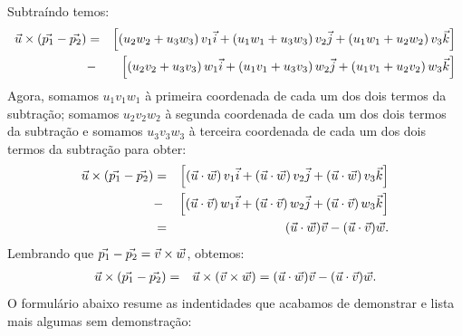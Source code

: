 Subtraíndo temos:
\begin{eqnarray*}
\vec{u}\times\left(\vec{p_1}-\vec{p_2}\right)&=&    \left[\left(u_2w_2+u_3w_3\right)v_1\vec{i}+\left(u_1w_1+u_3w_3\right)v_2\vec{j}+\left(u_1w_1+u_2w_2\right)v_3\vec{k}\right]\\
&-&
\left[\left(u_2v_2+u_3v_3\right)w_1\vec{i}+\left(u_1v_1+u_3v_3\right)w_2\vec{j}+\left(u_1v_1+u_2v_2\right)w_3\vec{k}\right]
\end{eqnarray*}
Agora, somamos $u_1v_1w_1$ à primeira coordenada de cada um dos dois termos da subtração; somamos $u_2v_2w_2$  à segunda coordenada de cada um dos dois termos da subtração e somamos $u_3v_3w_3$ à terceira coordenada de cada um dos dois termos da subtração para obter:
 \begin{eqnarray*}
 \vec{u}\times\left(\vec{p_1}-\vec{p_2}\right)&=&    \left[\left(\vec{u}\cdot\vec{w}\right)v_1\vec{i}+\left(\vec{u}\cdot\vec{w}\right)v_2\vec{j}+\left(\vec{u}\cdot\vec{w}\right)v_3\vec{k}\right]\\
 &-&
 \left[\left(\vec{u}\cdot\vec{v}\right)w_1\vec{i}+\left(\vec{u}\cdot\vec{v}\right)w_2\vec{j}+\left(\vec{u}\cdot\vec{v}\right)w_3\vec{k}\right]\\
 &=&(\vec{u}\cdot\vec{w})\vec{v}-(\vec{u}\cdot\vec{v})\vec{w}.
 \end{eqnarray*}
Lembrando que $\vec{p_1}-\vec{p_2}=\vec{v}\times\vec{w}$, obtemos:
\begin{eqnarray*}
\vec{u}\times\left(\vec{p_1}-\vec{p_2}\right)&=& 
\vec{u}\times\left(\vec{v}\times\vec{w}\right)=(\vec{u}\cdot\vec{w})\vec{v}-(\vec{u}\cdot\vec{v})\vec{w}.
\end{eqnarray*}
O formulário abaixo resume as indentidades que acabamos de demonstrar e lista mais algumas sem demonstração:

